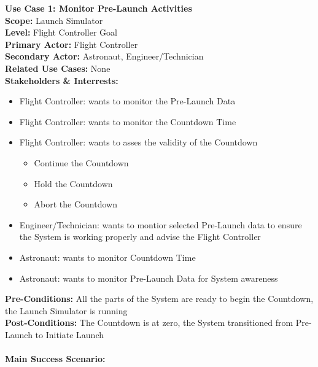 \documentclass[letterpaper]{article}
\begin{document}
\noindent
\textbf{Use Case 1:  Monitor Pre-Launch Activities}\\
\textbf{Scope:  }Launch Simulator\\
\textbf{Level:  }Flight Controller Goal\\
\textbf{Primary Actor:  }Flight Controller\\
\textbf{Secondary Actor:  }Astronaut, Engineer/Technician\\
\textbf{Related Use Cases:  }None\\
\textbf{Stakeholders \& Interrests:  }
\begin{itemize}
\item Flight Controller:  wants to monitor the Pre-Launch Data
\item Flight Controller:  wants to monitor the Countdown Time
\item Flight Controller:  wants to asses the validity of the Countdown
\begin{itemize}
\item Continue the Countdown
\item Hold the Countdown
\item Abort the Countdown
\end{itemize}
\item Engineer/Technician:  wants to montior selected Pre-Launch data
to ensure the System is working properly and advise the Flight
Controller
\item Astronaut:  wants to monitor Countdown Time
\item Astronaut:  wants to monitor Pre-Launch Data for System
awareness
\end{itemize}
\textbf{Pre-Conditions:  }All the parts of the System are ready to
begin the Countdown, the Launch Simulator is running\\
\textbf{Post-Conditions:  }The Countdown is at zero, the System
transitioned from Pre-Launch to Initiate Launch\\\\
\textbf{Main Success Scenario:  }\\
\end{document}
